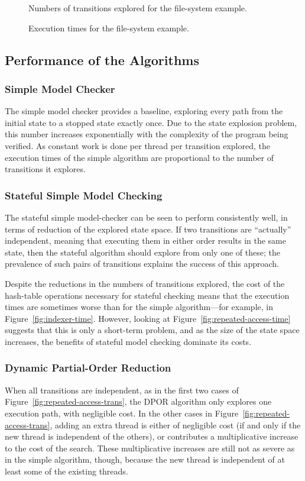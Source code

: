 \documentclass[12pt,a4paper,twoside,openany]{report}
\begin{document}
\begin{figure}
	\def\svgwidth{\textwidth}
	
	\caption{Numbers of transitions explored
		for the file-system example.}
	\label{fig:fs-trans}

	\def\svgwidth{\textwidth}
	
	\caption{Execution times
		for the file-system example.}
	\label{fig:fs-time}
\end{figure}

\newpage
\subsection{Performance of the Algorithms}

\subsubsection{Simple Model Checker}
The simple model checker provides a
baseline, exploring every path from
the initial state to a stopped state
exactly once. Due to the state explosion
problem, this number increases
exponentially with the complexity
of the program being verified.
As constant work is done per thread per transition
explored, the execution times of the simple
algorithm are
proportional to the number of transitions it
explores.

\subsubsection{Stateful Simple Model Checking}
The stateful simple model-checker can be
seen to perform consistently well, in terms
of reduction of the explored state space.
If two transitions are ``actually'' independent,
meaning that executing them in either order
results in the same state, then the stateful
algorithm should explore from only one of these;
the prevalence of such pairs of transitions
explains the success of this approach.

Despite the reductions in the numbers
of transitions explored, the cost of
the hash-table operations
necessary for stateful checking means that
the execution times
are sometimes worse than for the
simple algorithm---for example,
in Figure~\ref{fig:indexer-time}.
However, looking at Figure~\ref{fig:repeated-access-time}
suggests that this is only a short-term
problem, and as the size of the state
space increases, the benefits of
stateful model checking
dominate its costs.

\subsubsection{Dynamic Partial-Order Reduction}
When all transitions are independent,
as in the first two cases of
Figure~\ref{fig:repeated-access-trans},
the DPOR algorithm only explores
one execution path, with negligible cost.
In the other cases in
Figure~\ref{fig:repeated-access-trans},
adding an extra thread is either of
negligible cost (if and only if the new thread
is independent of the others), or
contributes a multiplicative
increase to the cost of the search.
These multiplicative increases are
still not as severe as in the
simple algorithm, though, because the new
thread is independent of at least some of
the existing threads.
\end{document}
